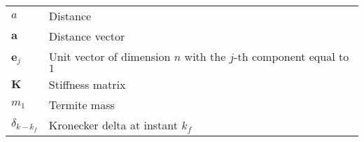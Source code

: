 \begin{longtable}{ll}
$a$ & Distance\\
$\textbf{a}$ & Distance vector\\
$\textbf{e}_{j}$ & Unit vector of dimension $n$ with the $j$-th component equal to $1$ \\
$\textbf{K}$ & Stiffness matrix\\
$m_1$ & Termite mass\\
$\delta_{k-k_f}$ & Kronecker delta at instant $k_f$\\
\end{longtable}

